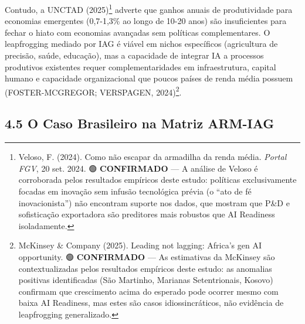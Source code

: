 \documentclass[
  brazilian,
  12pt,
]{article}
\begin{document}
Contudo, a UNCTAD (2025)\footnote{Veloso, F. (2024). Como não escapar da armadilha da renda média. \emph{Portal FGV}, 20 set. 2024. 🟢 \textbf{CONFIRMADO} --- A análise de Veloso é corroborada pelos resultados empíricos deste estudo: políticas exclusivamente focadas em inovação sem infusão tecnológica prévia (o ``ato de fé inovacionista'') não encontram suporte nos dados, que mostram que P\&D e sofisticação exportadora são preditores mais robustos que AI Readiness isoladamente.} adverte que ganhos anuais de produtividade para economias emergentes (0,7-1,3\% ao longo de 10-20 anos) são insuficientes para fechar o hiato com economias avançadas sem políticas complementares. O leapfrogging mediado por IAG é viável em nichos específicos (agricultura de precisão, saúde, educação), mas a capacidade de integrar IA a processos produtivos existentes requer complementaridades em infraestrutura, capital humano e capacidade organizacional que poucos países de renda média possuem (FOSTER-MCGREGOR; VERSPAGEN, 2024)\footnote{McKinsey \& Company (2025). Leading not lagging: Africa's gen AI opportunity. 🟢 \textbf{CONFIRMADO} --- As estimativas da McKinsey são contextualizadas pelos resultados empíricos deste estudo: as anomalias positivas identificadas (São Martinho, Marianas Setentrionais, Kosovo) confirmam que crescimento acima do esperado pode ocorrer mesmo com baixa AI Readiness, mas estes são casos idiossincráticos, não evidência de leapfrogging generalizado.}.

\subsection{4.5 O Caso Brasileiro na Matriz ARM-IAG}\label{o-caso-brasileiro-na-matriz-arm-iag}
\end{document}
